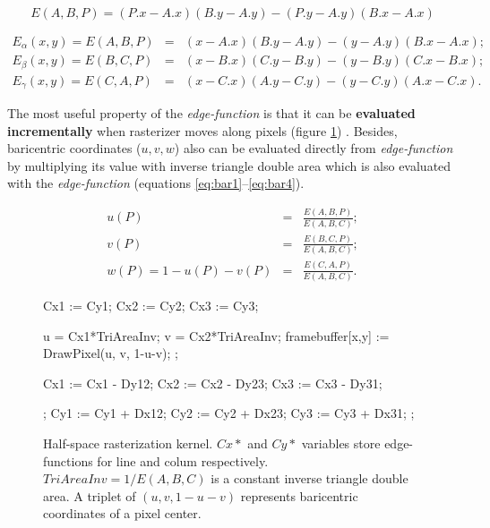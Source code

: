 \documentclass[12pt,subf,href,colorlinks=true]{article}
\begin{document}
\begin{equation}\label{eq:edgefunction}
	E(A,B,P) = (P.x - A.x) (B.y - A.y) - (P.y - A.y)(B.x - A.x)
\end{equation}

\begin{eqnarray}\label{eq:edgefunction1}
	E_{\alpha}(x,y) = E(A,B,P) &=& (x - A.x)(B.y - A.y) - (y - A.y)(B.x - A.x); \\ \label{eq:edgefunction2}
	E_{\beta} (x,y) = E(B,C,P) &=& (x - B.x)(C.y - B.y) - (y - B.y)(C.x - B.x); \\ \label{eq:edgefunction3}
	E_{\gamma}(x,y) = E(C,A,P) &=& (x - C.x)(A.y - C.y) - (y - C.y)(A.x - C.x).    \label{eq:edgefunction4}
\end{eqnarray}

The most useful property of the \textit{edge-function} is that it can be \textbf{evaluated incrementally} when rasterizer moves along pixels (figure \ref{alg:halfspace}) \cite{Pineda:1988:PAP:378456.378457}. Besides, baricentric coordinates ($u,v,w$) also can be evaluated directly from \textit{edge-function} by multiplying its value with inverse triangle double area which is also evaluated with the \textit{edge-function} (equations \ref{eq:bar1}--\ref{eq:bar4}).

\begin{eqnarray}\label{eq:bar1}
	u(P)        &=& \frac{E(A,B,P)}{E(A,B,C)} ;\\ \label{eq:bar2}
	v(P)        &=& \frac{E(B,C,P)}{E(A,B,C)} ;\\ \label{eq:bar3}
	w(P) = 1-u(P)-v(P) &=& \frac{E(C,A,P)}{E(A,B,C)}. \label{eq:bar4}
\end{eqnarray}

\begin{figure}[h]
	\begin{algorithmic}[1]
		
		\State Cx1 := Cy1; 
		\State Cx2 := Cy2; 
		\State Cx3 := Cy3; 
		
		
		\State u = Cx1*TriAreaInv;
		\State v = Cx2*TriAreaInv;
		\State framebuffer[x,y] := DrawPixel(u, v, 1-u-v);
		\EndIf;
		
		\State Cx1 := Cx1 - Dy12;
		\State Cx2 := Cx2 - Dy23;
		\State Cx3 := Cx3 - Dy31;
		
		\EndFor;
		\State Cy1 := Cy1 + Dx12;
		\State Cy2 := Cy2 + Dx23;
		\State Cy3 := Cy3 + Dx31; 	
		\EndFor;
		
	\end{algorithmic}
	\caption{Half-space rasterization kernel. $Cx*$ and $Cy*$ variables store edge-functions for line and colum respectively. $TriAreaInv=1/E(A,B,C)$ is a constant inverse triangle double area. A triplet of $(u,v, 1-u-v)$ represents baricentric coordinates of a pixel center. }\label{alg:halfspace}
\end{figure}
\end{document}
